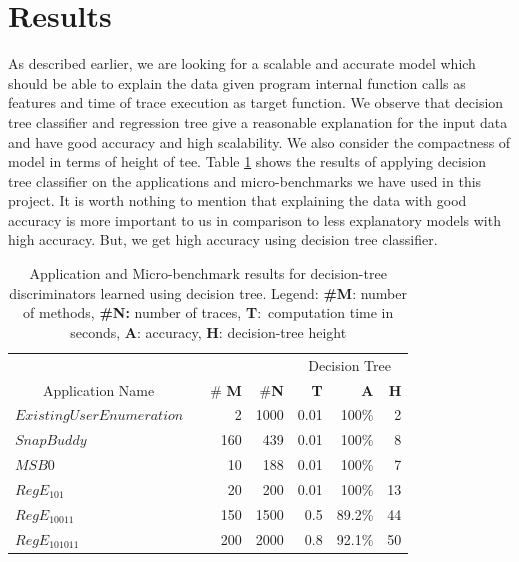 \documentclass{article}
\begin{document}
\section{Results}
As described earlier, we are looking for a scalable and accurate model which should
be able to explain the data given program internal function calls as features and time
of trace execution as target function. We observe that decision tree classifier and
regression tree give a reasonable explanation for the input data and have good
accuracy and high scalability. We also consider the compactness of model in
terms of height of tee. Table \ref{table7-1} shows the results of applying decision
tree classifier on the applications and micro-benchmarks we have used in this project.
It is worth nothing to mention that explaining the data with good accuracy is more
important to us in comparison to less explanatory models with high accuracy. But, we
get high accuracy using decision tree classifier. 

\begin{table}[t]
  \centering
  \caption{Application and Micro-benchmark results for decision-tree discriminators learned
    using decision tree. 
    Legend: \textbf{\#M}: number of methods, \textbf{\#N:} number of traces,
    \textbf{T}:\ computation time in seconds, \textbf{A}: accuracy, 
    \textbf{H}: decision-tree height %
   }
  \label{table7-1}
  \begin{tabular}{ || l | r | r || r | r | r ||}
    \hline
    &       &    & \multicolumn{3}{c||}{Decision Tree}\\
    ~~~~Application Name~~~~~~ & \# \textbf{M} & \#\textbf{N} & \textbf{T} & \textbf{A} & \textbf{H} \\ \hline
     $Existing User Enumeration$ & 2 & 1000 & 0.01 & 100\% & 2  \\ \hline
    $SnapBuddy$ & 160 & 439 & 0.01 & 100\% & 8  \\ \hline
    $MSB0$ & 10 & 188 & 0.01 & 100\% & 7  \\ \hline
    $RegE_{101}$ & 20 & 200 & 0.01 & 100\% & 13 \\ \hline
    $RegE_{10011}$ & 150 & 1500 & 0.5 & 89.2\% & 44  \\ \hline
    $RegE_{101011}$ & 200 & 2000 & 0.8 & 92.1\% & 50 \\ \hline
    \end{tabular}
\end{table}
\end{document}
